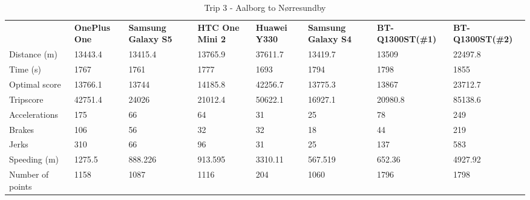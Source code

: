\begin{table*}[tb]
\centering
\caption{Trip 3 - Aalborg to Nørresundby}
\label{my-label}
\begin{tabular}{|l|lllllll|}
\hline
\rowcolor{tablegreen}

                 & \textbf{OnePlus One} & \textbf{Samsung Galaxy S5} & \textbf{HTC One Mini 2} & \textbf{Huawei Y330} & \textbf{Samsung Galaxy S4} & \textbf{BT-Q1300ST(\#1)} & \textbf{BT-Q1300ST(\#2)} \\
Distance (m)     & 13443.4     & 13415.4           & 13765.9        & 37611.7     & 13419.7           & 13509           & 22497.8         \\
Time (s)         & 1767        & 1761              & 1777           & 1693        & 1794              & 1798            & 1855            \\
Optimal score    & 13766.1     & 13744             & 14185.8        & 42256.7     & 13775.3           & 13867           & 23712.7         \\
Tripscore        & 42751.4     & 24026             & 21012.4        & 50622.1     & 16927.1           & 20980.8         & 85138.6         \\
Accelerations    & 175         & 66                & 64             & 31          & 25                & 78              & 249             \\
Brakes           & 106         & 56                & 32             & 32          & 18                & 44              & 219             \\
Jerks            & 310         & 66                & 96             & 31          & 25                & 137             & 583             \\
Speeding (m)     & 1275.5      & 888.226           & 913.595        & 3310.11     & 567.519           & 652.36          & 4927.92         \\
Number of points & 1158        & 1087              & 1116           & 204         & 1060              & 1796            & 1798      \\\hline     

\end{tabular}
\end{table*}

